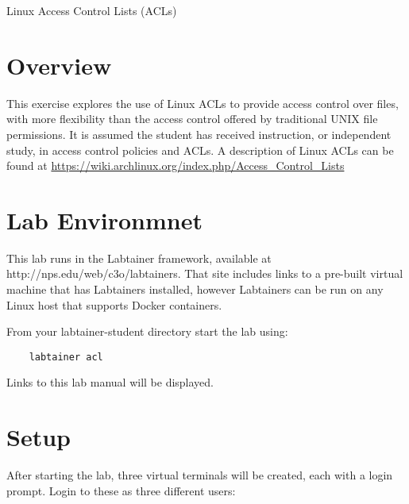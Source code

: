 


\begin{center}
{\LARGE Linux Access Control Lists (ACLs)}
\vspace{0.1in}\\
\end{center}

\copyrightnotice

\section{Overview}
This exercise explores the use of Linux ACLs to provide
access control over files, with more flexibility than 
the access control offered by traditional UNIX file permissions.
It is assumed the student has received instruction, or independent
study, in access control policies and ACLs.  A description of
Linux ACLs can be found at 
\url {https://wiki.archlinux.org/index.php/Access\_Control\_Lists}

\section{Lab Environmnet}
This lab runs in the Labtainer framework,
available at http://nps.edu/web/c3o/labtainers.
That site includes links to a pre-built virtual machine
that has Labtainers installed, however Labtainers can
be run on any Linux host that supports Docker containers.

From your labtainer-student directory start the lab using:
\begin{verbatim}
    labtainer acl
\end{verbatim}
Links to this lab manual will be displayed.  

\section{Setup}
After starting the lab, three virtual terminals will be created, each with a login
prompt.  Login to these as three different users:

